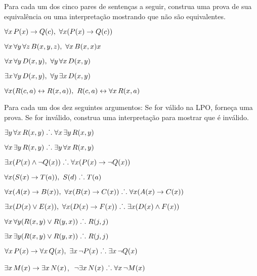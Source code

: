 \solutions
\problempart
\label{pr.FOLequivornot}
Para cada um dos cinco pares de sentenças a seguir, construa uma prova de sua equivalência ou uma interpretação mostrando que não são equivalentes.

\begin{earg}
\item $\forall x\,\mathord{P}(x) \rightarrow \mathord{Q}(c),\,\, \forall x (\mathord{P}(x) \rightarrow \mathord{Q}(c))$
\item $\forall x\,\forall y\, \forall z\,\mathord{B}(x,y,z),\,\, \forall x\,\mathord{B}(x,x)x$
\item $\forall x\,\forall y\,\mathord{D}(x,y),\,\, \forall y\,\forall x\,\mathord{D}(x,y)$
\item $\exists x\,\forall y\,\mathord{D}(x,y),\,\, \forall y\,\exists x\,\mathord{D}(x,y)$
\item $\forall x (\mathord{R}(c,a) \leftrightarrow \mathord{R}(x,a)),\,\, \mathord{R}(c,a) \leftrightarrow \forall x\,\mathord{R}(x,a)$
\end{earg}

\solutions
\problempart
\label{pr.FOLvalidornot}
Para cada um dos dez seguintes argumentos: Se for válido na LPO, forneça uma prova. Se for inválido, construa uma interpretação para mostrar que é inválido.
\begin{earg}
\item $\exists y\,\forall x\,\mathord{R}(x,y) \mathrel{\ldotp\dot{}\,\ldotp} \forall x\,\exists y\,\mathord{R}(x,y)$
\item $\forall x\,\exists y\,\mathord{R}(x,y) \mathrel{\ldotp\dot{}\,\ldotp}  \exists y\,\forall x\,\mathord{R}(x,y)$
\item $\exists x(\mathord{P}(x) \wedge \neg \mathord{Q}(x)) \mathrel{\ldotp\dot{}\,\ldotp} \forall x(\mathord{P}(x) \rightarrow \neg \mathord{Q}(x))$
\item $\forall x(\mathord{S}(x) \rightarrow \mathord{T}(a)),\,\, \mathord{S}(d) \mathrel{\ldotp\dot{}\,\ldotp} \mathord{T}(a)$
\item $\forall x(\mathord{A}(x)\rightarrow \mathord{B}(x)),\,\, \forall x(\mathord{B}(x) \rightarrow \mathord{C}(x)) \mathrel{\ldotp\dot{}\,\ldotp} \forall x(\mathord{A}(x) \rightarrow \mathord{C}(x))$
\item $\exists x(\mathord{D}(x) \vee \mathord{E}(x)),\,\, \forall x(\mathord{D}(x) \rightarrow \mathord{F}(x)) \mathrel{\ldotp\dot{}\,\ldotp} \exists x(\mathord{D}(x) \wedge \mathord{F}(x))$
\item $\forall x\,\forall y(\mathord{R}(x,y) \vee \mathord{R}(y,x)) \mathrel{\ldotp\dot{}\,\ldotp} \mathord{R}(j,j)$
\item $\exists x\,\exists y(\mathord{R}(x,y) \vee \mathord{R}(y,x)) \mathrel{\ldotp\dot{}\,\ldotp} \mathord{R}(j,j)$
\item $\forall x\,\mathord{P}(x) \rightarrow \forall x\,\mathord{Q}(x),\,\, \exists x\, \neg\mathord{P}(x) \mathrel{\ldotp\dot{}\,\ldotp} \exists x\, \neg \mathord{Q}(x)$
\item $\exists x\,\mathord{M}(x) \rightarrow \exists x\,\mathord{N}(x)$,\,\, $\neg \exists x\,\mathord{N}(x)\mathrel{\ldotp\dot{}\,\ldotp}  \forall x\, \neg \mathord{M}(x)$
\end{earg}

